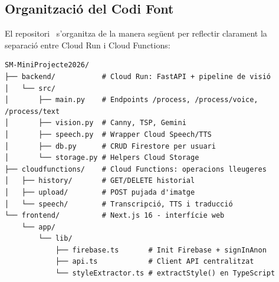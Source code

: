 \subsection{Organització del Codi Font}

El repositori~\cite{github} s'organitza de la manera següent per reflectir clarament la separació entre Cloud Run i Cloud Functions:

\begin{listing}[H]
\begin{verbatim}
SM-MiniProjecte2026/
├── backend/           # Cloud Run: FastAPI + pipeline de visió
│   └── src/
│       ├── main.py    # Endpoints /process, /process/voice, /process/text
│       ├── vision.py  # Canny, TSP, Gemini
│       ├── speech.py  # Wrapper Cloud Speech/TTS
│       ├── db.py      # CRUD Firestore per usuari
│       └── storage.py # Helpers Cloud Storage
├── cloudfunctions/    # Cloud Functions: operacions lleugeres
│   ├── history/       # GET/DELETE historial
│   ├── upload/        # POST pujada d'imatge
│   └── speech/        # Transcripció, TTS i traducció
└── frontend/          # Next.js 16 - interfície web
    └── app/
        └── lib/
            ├── firebase.ts       # Init Firebase + signInAnon
            ├── api.ts            # Client API centralitzat
            └── styleExtractor.ts # extractStyle() en TypeScript
\end{verbatim}
\caption{Estructura del repositori (simplificada).}
\label{lst:repo}
\end{listing}
